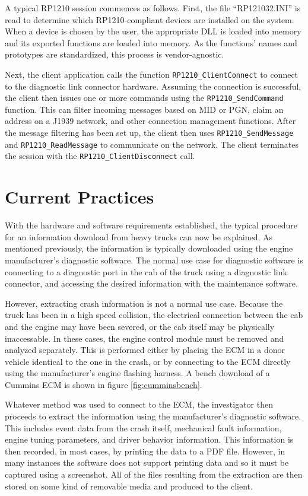 A typical RP1210 session commences as follows. First, the file ``RP121032.INI'' is read to determine which RP1210-compliant devices are installed
on the system. When a device is chosen by the user, the appropriate DLL is loaded into memory and its exported functions are loaded into memory.
As the functions' names and prototypes are standardized, this process is vendor-agnostic.

Next, the client application calls the function \texttt{RP1210\_ClientConnect} to connect to the diagnostic link connector hardware. Assuming
the connection is successful, the client then issues one or more commands using the \texttt{RP1210\_SendCommand} function. This can filter incoming
messages based on MID or PGN, claim an address on a J1939 network, and other connection management functions. After the message filtering has been
set up, the client then uses \texttt{RP1210\_SendMessage} and \texttt{RP1210\_ReadMessage} to communicate on the network. The client terminates
the session with the \texttt{RP1210\_ClientDisconnect} call.

\section{Current Practices}

With the hardware and software requirements established, the typical procedure for an information download from heavy trucks can now be explained.
As mentioned previously, the information is typically downloaded using the engine manufacturer's diagnostic software. The normal use case
for diagnostic software is connecting to a diagnostic port in the cab of the truck using a diagnostic link connector, and accessing the desired
information with the maintenance software.

However, extracting crash information is not a normal use case. Because the truck has been in a high speed collision, the electrical connection
between the cab and the engine may have been severed, or the cab itself may be physically inaccessable. In these cases, the engine control module
must be removed and analyzed separately. This is performed either by placing the ECM in a donor vehicle identical to the one in the crash, or
by connecting to the ECM directly using the manufacturer's engine flashing harness. A bench download of a Cummins ECM is shown in figure \ref{fig:cumminsbench}.

Whatever method was used to connect to the ECM, the investigator then proceeds to extract the information using the manufacturer's diagnostic
software. This includes event data from the crash itself, mechanical fault information, engine tuning parameters, and driver behavior information.
This information is then recorded, in most cases, by printing the data to a PDF file. However, in many instances the software does not support
printing data and so it must be captured using a screenshot. All of the files resulting from the extraction are then stored on some kind of
removable media and produced to the client.

